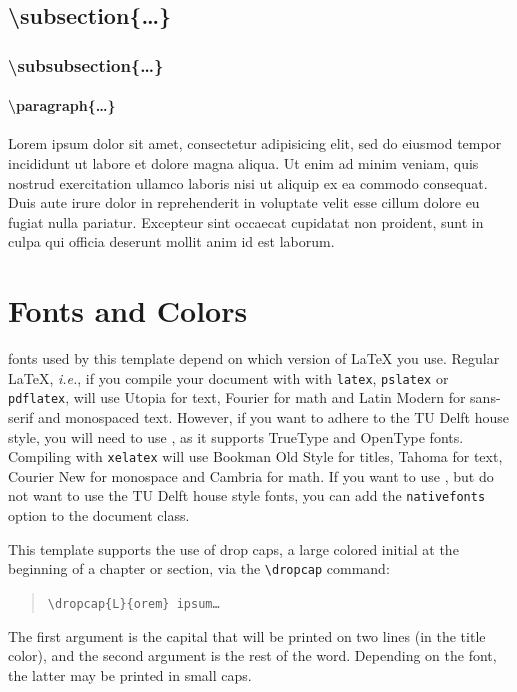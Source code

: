 \subsection{\textbackslash subsection\{\ldots\}}
\subsubsection{\textbackslash subsubsection\{\ldots\}}
\paragraph{\textbackslash paragraph\{\ldots\}}
Lorem ipsum dolor sit amet, consectetur adipisicing elit, sed do eiusmod tempor incididunt ut labore et dolore magna aliqua. Ut enim ad minim veniam, quis nostrud exercitation ullamco laboris nisi ut aliquip ex ea commodo consequat. Duis aute irure dolor in reprehenderit in voluptate velit esse cillum dolore eu fugiat nulla pariatur. Excepteur sint occaecat cupidatat non proident, sunt in culpa qui officia deserunt mollit anim id est laborum.

\section{Fonts and Colors}

 fonts used by this template depend on which version of \LaTeX{} you use. Regular \LaTeX, \emph{i.e.}, if you compile your document with with \texttt{latex}, \texttt{pslatex} or \texttt{pdflatex}, will use Utopia for text, Fourier for math and Latin Modern for sans-serif and monospaced text. However, if you want to adhere to the TU Delft house style, you will need to use \XeLaTeX, as it supports TrueType and OpenType fonts. Compiling with \texttt{xelatex} will use Bookman Old Style for titles, Tahoma for text, Courier New for monospace and Cambria for math. If you want to use \XeLaTeX, but do not want to use the TU Delft house style fonts, you can add the \texttt{nativefonts} option to the document class.

This template supports the use of drop caps, a large colored initial at the beginning of a chapter or section, via the \texttt{\textbackslash dropcap} command:

\begin{quote}
\texttt{\textbackslash dropcap\{L\}\{orem\} ipsum\ldots}
\end{quote}
The first argument is the capital that will be printed on two lines (in the title color), and the second argument is the rest of the word. Depending on the font, the latter may be printed in small caps.

